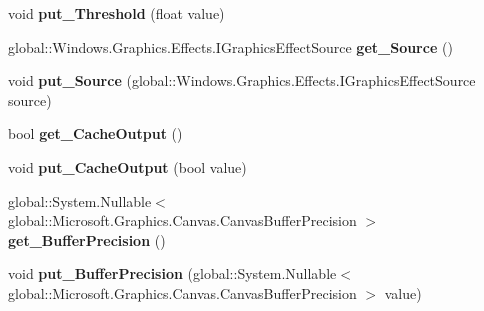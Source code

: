 \begin{DoxyCompactItemize}
\item 
\mbox{\label{class_microsoft_1_1_graphics_1_1_canvas_1_1_effects_1_1_sharpen_effect_a5f9d61f44f74075ed5a77d67e501fc4f}} 
void {\bfseries put\+\_\+\+Threshold} (float value)
\item 
\mbox{\label{class_microsoft_1_1_graphics_1_1_canvas_1_1_effects_1_1_sharpen_effect_a7bcfebcb9e3ceafcbf99dfeb3b9de323}} 
global\+::\+Windows.\+Graphics.\+Effects.\+I\+Graphics\+Effect\+Source {\bfseries get\+\_\+\+Source} ()
\item 
\mbox{\label{class_microsoft_1_1_graphics_1_1_canvas_1_1_effects_1_1_sharpen_effect_a12f91abb56e7ae6922c9313a4e00dfde}} 
void {\bfseries put\+\_\+\+Source} (global\+::\+Windows.\+Graphics.\+Effects.\+I\+Graphics\+Effect\+Source source)
\item 
\mbox{\label{class_microsoft_1_1_graphics_1_1_canvas_1_1_effects_1_1_sharpen_effect_a878fb9d2596f27d321f103b2d44aa79e}} 
bool {\bfseries get\+\_\+\+Cache\+Output} ()
\item 
\mbox{\label{class_microsoft_1_1_graphics_1_1_canvas_1_1_effects_1_1_sharpen_effect_ab7342a99c9d809586b3739414a9720b2}} 
void {\bfseries put\+\_\+\+Cache\+Output} (bool value)
\item 
\mbox{\label{class_microsoft_1_1_graphics_1_1_canvas_1_1_effects_1_1_sharpen_effect_a539a344bf7716b7ed100f902ce396a2f}} 
global\+::\+System.\+Nullable$<$ global\+::\+Microsoft.\+Graphics.\+Canvas.\+Canvas\+Buffer\+Precision $>$ {\bfseries get\+\_\+\+Buffer\+Precision} ()
\item 
\mbox{\label{class_microsoft_1_1_graphics_1_1_canvas_1_1_effects_1_1_sharpen_effect_a3b5a94080161ef7f49b7545c2e505b19}} 
void {\bfseries put\+\_\+\+Buffer\+Precision} (global\+::\+System.\+Nullable$<$ global\+::\+Microsoft.\+Graphics.\+Canvas.\+Canvas\+Buffer\+Precision $>$ value)

\end{DoxyCompactItemize}
